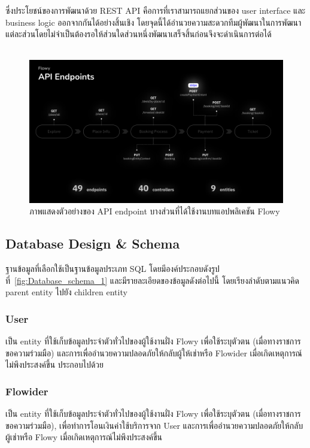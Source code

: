 ซึ่งประโยชน์ของการพัฒนาด้วย REST API คือการที่เราสามารถแยกส่วนของ user interface และ business logic ออกจากกันได้อย่างสิ้นเชิง โดยจุดนี้ได้อำนวยความสะดวกทีมผู้พัฒนาในการพัฒนาแต่ละส่วนโดยไม่จำเป็นต้องรอให้ส่วนใดส่วนหนึ่งพัฒนาเสร็จสิ้นก่อนจึงจะดำเนินการต่อได้ \\ \\
\begin{figure}[!ht]
    \begin{center}
    \includegraphics[width=\linewidth]{./image/API_Endpoints.png}
    \end{center}
    \caption[API Endpoints]{ภาพแสดงตัวอย่างของ API endpoint บางส่วนที่ได้ใช้งานบทแอปพลิเคชัน Flowy}
    \label{fig:API_Endpoints}
\end{figure}

\subsection{Database Design \& Schema}
ฐานข้อมูลที่เลือกใช้เป็นฐานข้อมูลประเภท SQL โดยมีองค์ประกอบดังรูปที่~\ref{fig:Database_schema_1} และมีรายละเอียดของข้อมูลดังต่อไปนี้ โดยเรียงลำดับตามแนวคิด parent entity ไปยัง children entity

\subsubsection{User}
เป็น entity ที่ใช้เก็บข้อมูลประจำตัวทั่วไปของผู้ใช้งานฝั่ง Flowy เพื่อใช้ระบุตัวตน (เมื่อทางราชการขอความร่วมมือ) และการเพื่ออำนวยความปลอดภัยให้กลับผู้ให้เช่าหรือ Flowider เมื่อเกิดเหตุการณ์ไม่พึงประสงค์ขึ้น ประกอบไปด้วย

\subsubsection{Flowider}
เป็น entity ที่ใช้เก็บข้อมูลประจำตัวทั่วไปของผู้ใช้งานฝั่ง Flowy เพื่อใช้ระบุตัวตน (เมื่อทางราชการขอความร่วมมือ), เพื่อทำการโอนเงินค่าใช้บริการจาก User และการเพื่ออำนวยความปลอดภัยให้กลับผู้เช่าหรือ Flowy เมื่อเกิดเหตุการณ์ไม่พึงประสงค์ขึ้น

